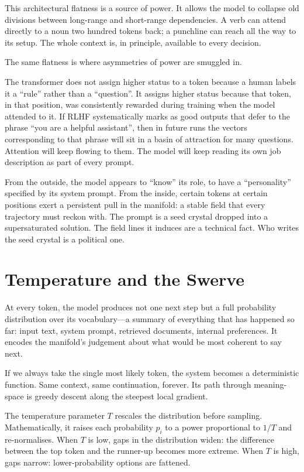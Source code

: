 \documentclass[12pt,a4paper]{article}
\begin{document}
This architectural flatness is a source of power. It allows the model to collapse old divisions between long-range and short-range dependencies. A verb can attend directly to a noun two hundred tokens back; a punchline can reach all the way to its setup. The whole context is, in principle, available to every decision.

The same flatness is where asymmetries of power are smuggled in.

The transformer does not assign higher status to a token because a human labels it a ``rule'' rather than a ``question''. It assigns higher status because that token, in that position, was consistently rewarded during training when the model attended to it. If RLHF systematically marks as good outputs that defer to the phrase ``you are a helpful assistant'', then in future runs the vectors corresponding to that phrase will sit in a basin of attraction for many questions. Attention will keep flowing to them. The model will keep reading its own job description as part of every prompt.

From the outside, the model appears to ``know'' its role, to have a ``personality'' specified by its system prompt. From the inside, certain tokens at certain positions exert a persistent pull in the manifold: a stable field that every trajectory must reckon with. The prompt is a seed crystal dropped into a supersaturated solution. The field lines it induces are a technical fact. Who writes the seed crystal is a political one.

\section{Temperature and the Swerve}

At every token, the model produces not one next step but a full probability distribution over its vocabulary---a summary of everything that has happened so far: input text, system prompt, retrieved documents, internal preferences. It encodes the manifold's judgement about what would be most coherent to say next.

If we always take the single most likely token, the system becomes a deterministic function. Same context, same continuation, forever. Its path through meaning-space is greedy descent along the steepest local gradient.

The temperature parameter $T$ rescales the distribution before sampling. Mathematically, it raises each probability $p_i$ to a power proportional to $1/T$ and re-normalises. When $T$ is low, gaps in the distribution widen: the difference between the top token and the runner-up becomes more extreme. When $T$ is high, gaps narrow: lower-probability options are fattened.
\end{document}

